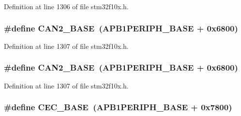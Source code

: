 Definition at line 1306 of file stm32f10x.\+h.

\subsubsection[{\texorpdfstring{C\+A\+N2\+\_\+\+B\+A\+SE}{CAN2_BASE}}]{\setlength{\rightskip}{0pt plus 5cm}\#define C\+A\+N2\+\_\+\+B\+A\+SE~({\bf A\+P\+B1\+P\+E\+R\+I\+P\+H\+\_\+\+B\+A\+SE} + 0x6800)}\hypertarget{group___peripheral__memory__map_gaf7b8267b0d439f8f3e82f86be4b9fba1}{}\label{group___peripheral__memory__map_gaf7b8267b0d439f8f3e82f86be4b9fba1}


Definition at line 1307 of file stm32f10x.\+h.

\subsubsection[{\texorpdfstring{C\+A\+N2\+\_\+\+B\+A\+SE}{CAN2_BASE}}]{\setlength{\rightskip}{0pt plus 5cm}\#define C\+A\+N2\+\_\+\+B\+A\+SE~({\bf A\+P\+B1\+P\+E\+R\+I\+P\+H\+\_\+\+B\+A\+SE} + 0x6800)}\hypertarget{group___peripheral__memory__map_gaf7b8267b0d439f8f3e82f86be4b9fba1}{}\label{group___peripheral__memory__map_gaf7b8267b0d439f8f3e82f86be4b9fba1}


Definition at line 1307 of file stm32f10x.\+h.

\subsubsection[{\texorpdfstring{C\+E\+C\+\_\+\+B\+A\+SE}{CEC_BASE}}]{\setlength{\rightskip}{0pt plus 5cm}\#define C\+E\+C\+\_\+\+B\+A\+SE~({\bf A\+P\+B1\+P\+E\+R\+I\+P\+H\+\_\+\+B\+A\+SE} + 0x7800)}\hypertarget{group___peripheral__memory__map_gaacb77bc44b3f8c87ab98f241e760e440}{}\label{group___peripheral__memory__map_gaacb77bc44b3f8c87ab98f241e760e440}


